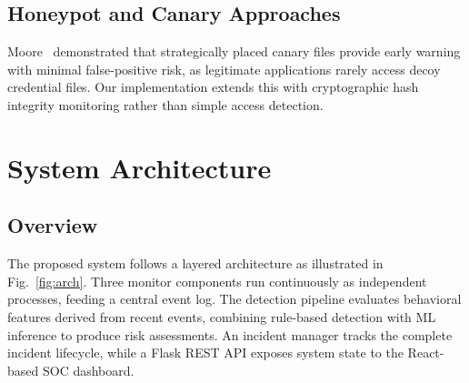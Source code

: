 \documentclass[conference]{IEEEtran}
\begin{document}
\subsection{Honeypot and Canary Approaches}

Moore~\cite{moore2016} demonstrated that strategically placed
canary files provide early warning with minimal false-positive
risk, as legitimate applications rarely access decoy credential
files. Our implementation extends this with cryptographic hash
integrity monitoring rather than simple access detection.


\section{System Architecture}

\subsection{Overview}

The proposed system follows a layered architecture as
illustrated in Fig.~\ref{fig:arch}. Three monitor components
run continuously as independent processes, feeding a central
event log. The detection pipeline evaluates behavioral features
derived from recent events, combining rule-based detection
with ML inference to produce risk assessments. An incident
manager tracks the complete incident lifecycle, while a
Flask REST API exposes system state to the React-based
SOC dashboard.
\end{document}
